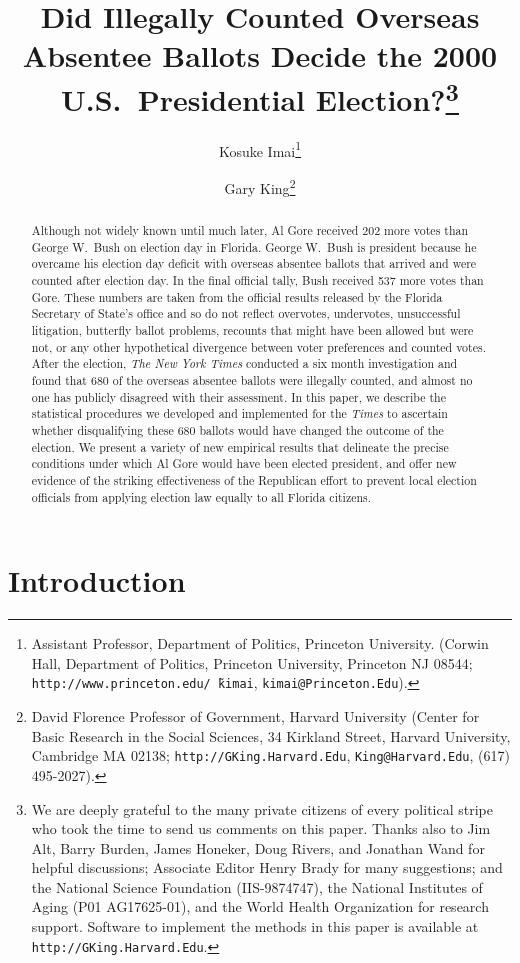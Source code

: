 \documentclass[11pt,titlepage]{article}
\title{Did Illegally Counted Overseas Absentee Ballots Decide the 2000
  U.S.\ Presidential Election?\thanks{We are deeply grateful to the
    many private citizens of every political stripe who took the time
    to send us comments on this paper.  Thanks also to Jim Alt, Barry
    Burden, James Honeker, Doug Rivers, and Jonathan Wand for helpful
    discussions; Associate Editor Henry Brady for many suggestions;
    and the National Science Foundation (IIS-9874747), the National
    Institutes of Aging (P01 AG17625-01), and the World Health
    Organization for research support.  Software to implement the
    methods in this paper is available at
    \texttt{http://GKing.Harvard.Edu}.}}
\author{Kosuke Imai\thanks{Assistant Professor, Department of Politics,
    Princeton University. (Corwin Hall, Department of Politics,
    Princeton University, Princeton NJ 08544;
    \texttt{http://www.princeton.edu/\~\,kimai},
    \texttt{kimai@Princeton.Edu}).}
\and %
Gary King\thanks{David Florence Professor of Government, Harvard
  University (Center for Basic Research in the Social Sciences, 34
  Kirkland Street, Harvard University, Cambridge MA 02138;
  \texttt{http://GKing.Harvard.Edu}, \texttt{King@Harvard.Edu}, (617)
  495-2027).}  }
\begin{document}
\maketitle
{}\baselineskip

\begin{abstract}
  Although not widely known until much later, Al Gore received 202
  more votes than George W.\ Bush on election day in Florida.  George
  W.\ Bush is president because he overcame his election day deficit
  with overseas absentee ballots that arrived and were counted after
  election day.  In the final official tally, Bush received 537 more
  votes than Gore.  These numbers are taken from the official results
  released by the Florida Secretary of State's office and so do not
  reflect overvotes, undervotes, unsuccessful litigation, butterfly
  ballot problems, recounts that might have been allowed but were not,
  or any other hypothetical divergence between voter preferences and
  counted votes.  After the election, \emph{The New York Times}
  conducted a six month investigation and found that 680 of the
  overseas absentee ballots were illegally counted, and almost no one
  has publicly disagreed with their assessment.  In this paper, we
  describe the statistical procedures we developed and implemented for
  the \emph{Times} to ascertain whether disqualifying these 680
  ballots would have changed the outcome of the election.  We present
  a variety of new empirical results that delineate the precise
  conditions under which Al Gore would have been elected president,
  and offer new evidence of the striking effectiveness of the
  Republican effort to prevent local election officials from applying
  election law equally to all Florida citizens.
\end{abstract}


\section{Introduction}
\end{document}
